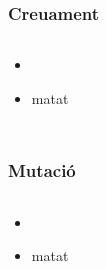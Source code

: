 \documentclass{beamer}
\begin{document}
\begin{frame}
	\frametitle{Creuament}
	\begin{columns}[c]
		\begin{itemize}
			\item 
				\pause
			\item matat
		\end{itemize}
	\end{columns}
\end{frame}

\begin{frame}
	\frametitle{Mutació}
	\begin{columns}[c]
		\begin{itemize}
			\item 
				\pause
			\item matat
		\end{itemize}
	\end{columns}
\end{frame}
\end{document}
